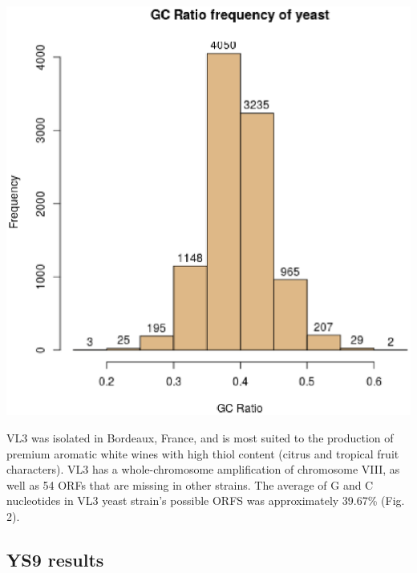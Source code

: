 \documentclass{article}
\begin{document}
\begin{minipage}{0.5\textwidth}
\includegraphics[width=\textwidth]{images/VL3_AWRI_2011_AEJS01000000.eps}
\end{minipage}
\begin{minipage}{0.5\textwidth}
VL3 was isolated in Bordeaux, France, and is most suited to the production of premium aromatic 
white wines with high thiol content (citrus and tropical fruit characters). 
VL3 has a whole-chromosome amplification of chromosome VIII, as well as 54 ORFs that are missing in other strains.
The average of G and C nucleotides in VL3 yeast strain's possible ORFS was approximately 39.67\%
(Fig. 2).  
\vspace{1cm}\\
\end{minipage}

\subsection{YS9 results}
\end{document}

